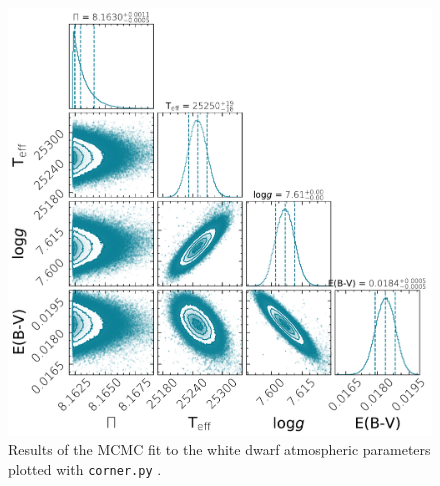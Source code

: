 \documentclass[fleqn,usenatbib]{mnras}
\begin{document}
\begin{figure}
    \centering
    \includegraphics[width=\columnwidth]{cccet_corner.pdf}
    \caption{Results of the MCMC fit to the white dwarf atmospheric parameters plotted with {\tt corner.py} \citep{corner}.}
    \label{fig:mcmc}
\end{figure}



\bsp	%
\label{lastpage}
\end{document}
